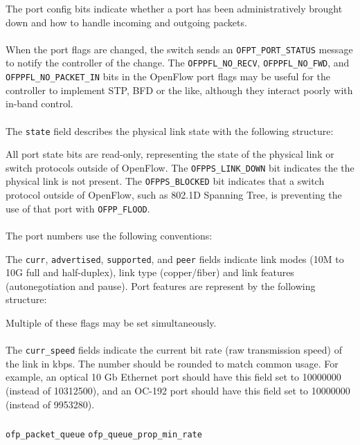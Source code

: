 
The port config bits indicate whether a port has been administratively brought down and how to handle incoming and outgoing packets.
\\\\
When the port flags are changed, the switch sends an \verb|OFPT_PORT_STATUS| message to notify the controller of the change. The \verb|OFPPFL_NO_RECV|, \verb|OFPPFL_NO_FWD|, and \verb|OFPPFL_NO_PACKET_IN| bits in the OpenFlow port flags may be useful for the controller to implement STP, BFD or the like, although they interact poorly with in-band control.
\\\\
The \verb|state| field describes the physical link state with the following structure:


All port state bits are read-only, representing the state of the physical link or switch protocols outside of OpenFlow. The \verb|OFPPS_LINK_DOWN| bit indicates the the physical link is not present. The \verb|OFPPS_BLOCKED| bit indicates that a switch protocol outside of OpenFlow, such as 802.1D Spanning Tree, is preventing the use of that port with \verb|OFPP_FLOOD|.
\\\\
The port numbers use the following conventions:


The \verb|curr|, \verb|advertised|, \verb|supported|, and \verb|peer| fields indicate link modes (10M to 10G full and half-duplex), link type (copper/fiber) and link features (autonegotiation and pause).  Port features are represent by the following structure:


Multiple of these flags may be set simultaneously.
\\\\
The \verb|curr_speed| fields indicate the current bit rate (raw transmission speed) of the link in kbps. The number should be rounded to match common usage. For example, an optical 10 Gb Ethernet port should have this field set to 10000000 (instead of 10312500), and an OC-192 port should have this field set to 10000000 (instead of 9953280).

\subsubsection{}
\label{cts:qos}
 \verb|ofp_packet_queue| 
\verb|ofp_queue_prop_min_rate| 

